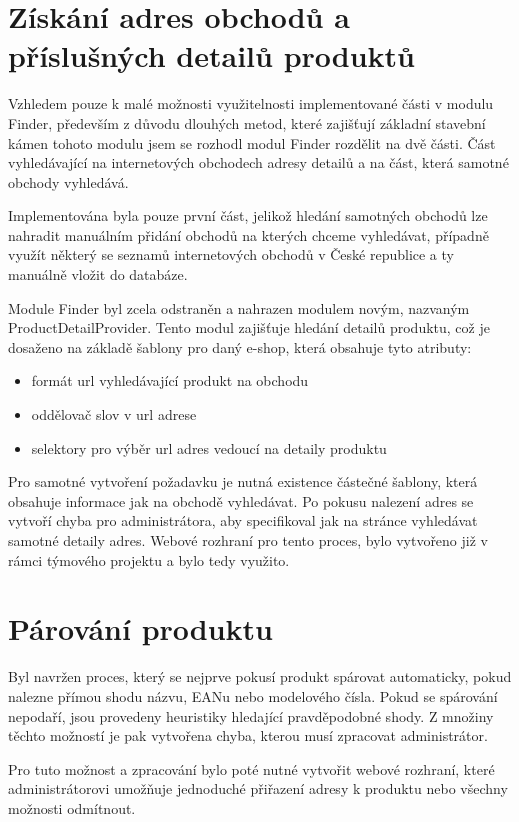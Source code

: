 \documentclass[thesis=B,czech]{FITthesis}[2012/06/26]
\begin{document}
\section{Získání adres obchodů a příslušných detailů produktů}
Vzhledem pouze k malé možnosti využitelnosti implementované části v modulu Finder, především z důvodu dlouhých metod, které zajišťují
základní stavební kámen tohoto modulu jsem se rozhodl modul Finder rozdělit na dvě části. Část vyhledávající 
na internetových obchodech adresy detailů a na část, která samotné obchody vyhledává.
\par
Implementována byla pouze první část, jelikož hledání samotných obchodů lze nahradit manuálním přidání obchodů na kterých chceme vyhledávat, případně 
využít některý se seznamů internetových obchodů v České republice a ty manuálně vložit do databáze.
\par
Module Finder byl zcela odstraněn a nahrazen modulem novým, nazvaným ProductDetailProvider.
Tento modul zajišťuje hledání detailů produktu, což je dosaženo na základě šablony pro daný e-shop, která obsahuje 
tyto atributy:
\begin{itemize}
\item formát url vyhledávající produkt na obchodu
\item oddělovač slov v url adrese
\item selektory pro výběr url adres vedoucí na detaily produktu
\end{itemize}
Pro samotné vytvoření požadavku je nutná existence částečné šablony, která obsahuje informace jak na obchodě vyhledávat.
Po pokusu nalezení adres se vytvoří chyba pro administrátora, aby specifikoval jak na stránce vyhledávat samotné detaily adres. Webové rozhraní
pro tento proces, bylo vytvořeno již v rámci týmového projektu a bylo tedy využito.


\section{Párování produktu}
Byl navržen proces, který se nejprve pokusí produkt spárovat automaticky, pokud nalezne přímou shodu názvu, EANu nebo modelového čísla.
Pokud se spárování nepodaří, jsou provedeny heuristiky hledající pravděpodobné shody. Z množiny těchto možností je pak 
vytvořena chyba, kterou musí zpracovat administrátor.
\par
Pro tuto možnost a zpracování bylo poté nutné vytvořit webové rozhraní, které administrátorovi umožňuje jednoduché přiřazení 
adresy k produktu nebo všechny možnosti odmítnout.
\end{document}
